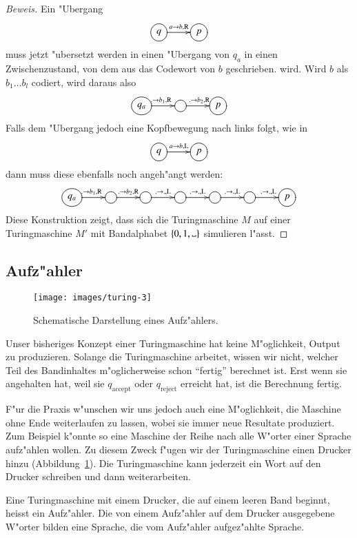 \begin{proof}[Beweis]
Ein "Ubergang
\[
\entrymodifiers={++[o][F]}
\xymatrix{
q\ar[r]^{a\to b,\text{R}}
	&p
}
\]
muss jetzt "ubersetzt werden in einen "Ubergang von $q_a$ in einen
Zwischenzustand, von dem aus das Codewort von $b$ geschrieben.
wird. Wird $b$ als $b_1\dots b_l$ codiert, wird daraus also
\[
\entrymodifiers={++[o][F]}
\xymatrix{
q_a\ar[r]^{.\to b_1,\text{R}}
	&\ar[r]^{.\to b_2,\text{R}}
		&p
}
\]
Falls dem "Ubergang jedoch eine Kopfbewegung nach links folgt, wie in
\[
\entrymodifiers={++[o][F]}
\xymatrix{
q\ar[r]^{a\to b,\text{L}}
	&p
}
\]
dann muss diese ebenfalls noch angeh"angt werden:
\[
\entrymodifiers={++[o][F]}
\xymatrix{
q_a\ar[r]^{.\to b_1,\text{R}}
	&\ar[r]^{.\to b_2,\text{R}}
		&\ar[r]^{.\to .,\text{L}}
			&\ar[r]^{.\to .,\text{L}}
				&\ar[r]^{.\to .,\text{L}}
					&\ar[r]^{.\to .,\text{L}}
						&p
}
\]
Diese Konstruktion zeigt, dass sich die Turingmaschine $M$ auf einer
Turingmaschine $M'$ mit Bandalphabet $\{0,1,\blank\}$ simulieren
l"asst.
\end{proof}

\subsection{Aufz"ahler}
\begin{figure}
\begin{center}
\texttt{[image: images/turing-3]}
\end{center}
\caption{Schematische Darstellung eines Aufz"ahlers.\label{turing-aufzaehler}}
\end{figure}
Unser bisheriges Konzept einer Turingmaschine hat keine M"oglichkeit,
Output zu produzieren. Solange die Turingmaschine arbeitet, wissen wir
nicht, welcher Teil des Bandinhaltes m"oglicherweise schon ``fertig''
berechnet ist. Erst wenn sie angehalten hat, weil sie $q_{\text{accept}}$
oder $q_{\text{reject}}$ erreicht hat, ist die Berechnung fertig.

F"ur die Praxis w"unschen wir uns jedoch auch eine M"oglichkeit,
die Maschine ohne Ende weiterlaufen zu lassen, wobei sie immer neue
Resultate produziert. Zum Beispiel k"onnte so eine Maschine der Reihe
nach alle W"orter einer Sprache aufz"ahlen wollen. Zu diesem Zweck 
f"ugen wir der Turingmaschine einen Drucker hinzu
(Abbildung~\ref{turing-aufzaehler}). Die Turingmaschine
kann jederzeit ein Wort auf den Drucker schreiben und dann
weiterarbeiten.

\begin{definition}
Eine Turingmaschine mit einem Drucker, die auf einem leeren Band beginnt,
heisst ein Aufz"ahler. Die von einem Aufz"ahler auf dem Drucker ausgegebene
W"orter bilden eine Sprache, die vom Aufz"ahler aufgez"ahlte Sprache.
\end{definition}

